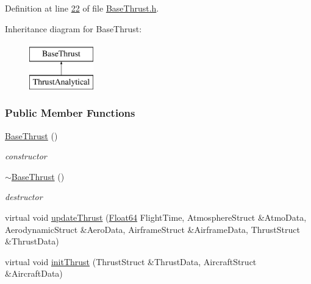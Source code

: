 Definition at line \hyperlink{_base_thrust_8h_source_l00022}{22} of file \hyperlink{_base_thrust_8h_source}{Base\+Thrust.\+h}.

Inheritance diagram for Base\+Thrust\+:\begin{figure}[H]
\begin{center}
\leavevmode
\includegraphics[height=2.000000cm]{group___engine}
\end{center}
\end{figure}
\subsubsection*{Public Member Functions}
\begin{DoxyCompactItemize}
\item 
\mbox{\label{group___engine_a19885a6a70bfc4c02e2d8f310af9f22e}} 
\hyperlink{group___engine_a19885a6a70bfc4c02e2d8f310af9f22e}{Base\+Thrust} ()
\begin{DoxyCompactList}\small\item\em constructor \end{DoxyCompactList}\item 
\mbox{\label{group___engine_a554955351c2acfe7a46c00fe056c5c6c}} 
\hyperlink{group___engine_a554955351c2acfe7a46c00fe056c5c6c}{$\sim$\+Base\+Thrust} ()
\begin{DoxyCompactList}\small\item\em destructor \end{DoxyCompactList}\item 
virtual void \hyperlink{group___engine_a869359a1b2b7cddcbe5979d6a1cf5eac}{update\+Thrust} (\hyperlink{group___tools_ga3f1431cb9f76da10f59246d1d743dc2c}{Float64} Flight\+Time, Atmosphere\+Struct \&Atmo\+Data, Aerodynamic\+Struct \&Aero\+Data, Airframe\+Struct \&Airframe\+Data, Thrust\+Struct \&Thrust\+Data)
\item 
virtual void \hyperlink{group___engine_a02b3fe7f763d84c5d34b59f124eaf455}{init\+Thrust} (Thrust\+Struct \&Thrust\+Data, Aircraft\+Struct \&Aircraft\+Data)
\end{DoxyCompactItemize}



